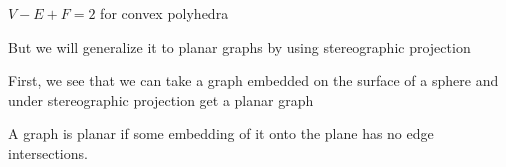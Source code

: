 \begin{theorem}
    $V-E+F=2$ for convex polyhedra
\end{theorem}
But we will generalize it to planar graphs by using stereographic projection

First, we see that we can take a graph embedded on the surface of a sphere and under stereographic projection get a planar graph \\






\begin{definition}[Planarity]
    A graph is planar if some embedding of it onto the plane has no edge intersections.
\end{definition}

